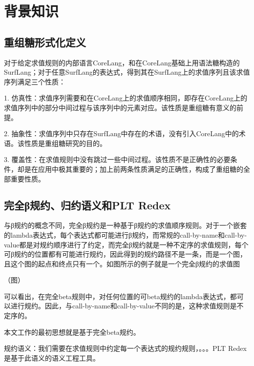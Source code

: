 \pagestyle{fancy}
\normalsize
\linespread{1.5}\selectfont
\chapter{背景知识}

\section{重组糖形式化定义}
对于给定求值规则的内部语言CoreLang，和在CoreLang基础上用语法糖构造的SurfLang；对于任意SurfLang的表达式，得到其在SurfLang上的求值序列且该求值序列满足三个性质：

1.	仿真性：求值序列需要和在CoreLang上的求值顺序相同，即存在CoreLang上的求值序列中的部分中间过程与该序列中的元素对应。该性质是重组糖有意义的前提。

2.	抽象性：求值序列中只存在SurfLang中存在的术语，没有引入CoreLang中的术语。该性质是重组糖研究的目的。

3.	覆盖性：在求值规则中没有跳过一些中间过程。该性质不是正确性的必要条件，却是在应用中极其重要的；加上前两条性质满足的正确性，构成了重组糖的全部重要性质。

\section{完全β规约、归约语义和PLT Redex}
与β规约的概念不同，完全β规约是一种基于β规约的求值顺序规则。对于一个嵌套的lambda表达式，每个表达式都可能进行β规约，而常规的call-by-name和call-by-value都是对规约顺序进行了约定，而完全β规约就是一种不定序的求值规则，每个可β规约的位置都有可能进行规约，因此得到的规约路径不是一条，而是一个图，且这个图的起点和终点只有一个。如图所示的例子就是一个完全β规约的求值图

（图）

可以看出，在完全beta规则中，对任何位置的可beta规约的lambda表达式，都可以进行规约。因此，与call-by-name和call-by-value不同的是，这种求值规则是不定序的。

本文工作的最初思想就是基于完全beta规约。

规约语义：我们需要在求值规则中约定每一个表达式的规约规则，。。。PLT Redex是基于此语义的语义工程工具。
